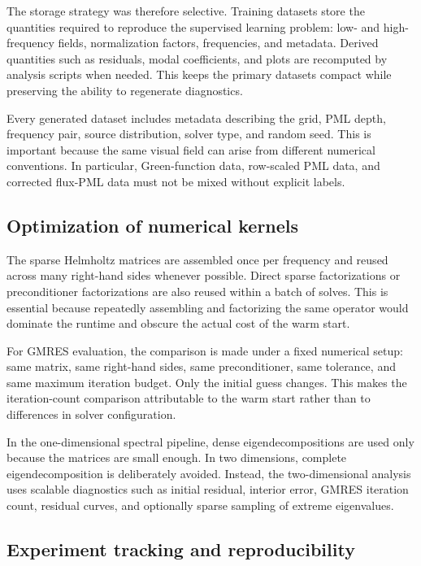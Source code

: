 The storage strategy was therefore selective. Training datasets store the
quantities required to reproduce the supervised learning problem: low- and
high-frequency fields, normalization factors, frequencies, and metadata.
Derived quantities such as residuals, modal coefficients, and plots are
recomputed by analysis scripts when needed. This keeps the primary datasets
compact while preserving the ability to regenerate diagnostics.

Every generated dataset includes metadata describing the grid, PML depth,
frequency pair, source distribution, solver type, and random seed. This is
important because the same visual field can arise from different numerical
conventions. In particular, Green-function data, row-scaled PML data, and
corrected flux-PML data must not be mixed without explicit labels.


\subsection{Optimization of numerical kernels}
\label{subsec:computational_kernels}

The sparse Helmholtz matrices are assembled once per frequency and reused
across many right-hand sides whenever possible. Direct sparse factorizations
or preconditioner factorizations are also reused within a batch of solves.
This is essential because repeatedly assembling and factorizing the same
operator would dominate the runtime and obscure the actual cost of the warm
start.

For GMRES evaluation, the comparison is made under a fixed numerical setup:
same matrix, same right-hand sides, same preconditioner, same tolerance, and
same maximum iteration budget. Only the initial guess changes. This makes the
iteration-count comparison attributable to the warm start rather than to
differences in solver configuration.

In the one-dimensional spectral pipeline, dense eigendecompositions are used
only because the matrices are small enough. In two dimensions, complete
eigendecomposition is deliberately avoided. Instead, the two-dimensional
analysis uses scalable diagnostics such as initial residual, interior error,
GMRES iteration count, residual curves, and optionally sparse sampling of
extreme eigenvalues.


\subsection{Experiment tracking and reproducibility}
\label{subsec:computational_tracking}

